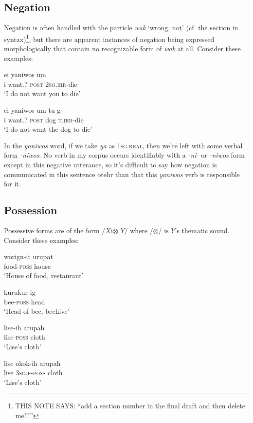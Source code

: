 \documentclass[pdftex,12pt,letterpaper]{article}
\let\ipa\textipa
\def\sw{\ipa{\super w}}
\begin{document}
\subsection{Negation}

Negation is often handled with the particle \emph{wak} `wrong, not' (cf. the section in syntax)\footnote{THIS NOTE SAYS: ``add a section number in the final draft and then delete me!!!''}, but there are apparent instances of negation being expressed morphologically that contain no recognizable form of \emph{wak} at all. Consider these examples:

\begin{exe}
 \ex
 \gll ei yaniwos um \ipa{\textltailn@} \ipa{\textltailn u-g@k} \\
 i want.? \textsc{post} \textsc{2sg.irr}-die \\
 \trans `I do not want you to die'
 
 \ex
 \gll ei yaniwos um \ipa{n1mbat} tu-g\ipa{@k} \\
 i want.? \textsc{post} dog \textsc{t.irr}-die \\
 \trans `I do not want the dog to die'
\end{exe}

In the \emph{yaniwos} word, if we take \emph{ya} as \textsc{1sg.real}, then we're left with some verbal form \emph{-niwos}. No verb in my corpus occurs identifiably with a \emph{-ni-} or \emph{-niwos} form except in this negative utterance, so it's difficult to say how negation is communicated in this sentence otehr than that this \emph{yaniwos} verb is responsible for it.

\subsection{Possession}

Possessive forms are of the form /$X$i$\otimes$ $Y$/ where /$\otimes$/ is $Y$'s thematic sound. Consider these examples:

\begin{exe}
\ex
\gll worig\ipa{1}n-it urupat \\
food-\textsc{poss} house \\
\trans `House of food, restaurant'

\ex
\gll kurukur-ig \ipa{b@r@g} \\
bee-\textsc{poss} head \\
\trans `Head of bee, beehive'

\ex
\gll lise-ih arupah \\
lise-\textsc{poss} cloth \\
\trans `Lise's cloth'

\ex
\gll lise ok\sw ok\sw-ih arupah \\
lise \textsc{3sg.f}-\textsc{poss} cloth \\
\trans `Lise's cloth'

\end{exe}
\end{document}
